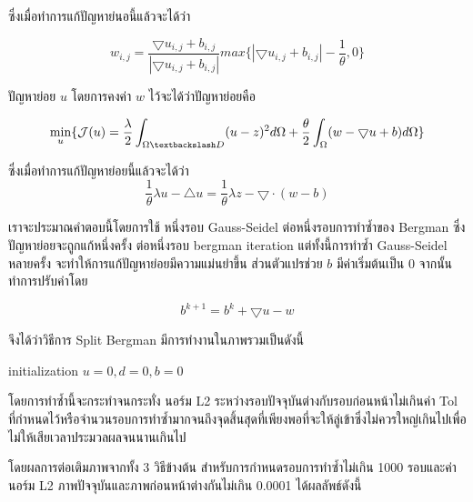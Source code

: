 \documentclass[hidelinks,a4paper,14pt]{article}
\numberwithin{equation}{section}							%
\begin{document}
{			ซึ่งเมื่อทำการแก้ปัญหาย่นอนี้แล้วจะได้ว่า
			
				$$ w_{i,j} = \frac{\bigtriangledown u_{i,j}  + b_{i,j} }{ | \bigtriangledown u_{i,j}  + b_{i,j} | } max \{  | \bigtriangledown u_{i,j}  + b_{i,j} | - \frac{1}{\theta} , 0\} $$
				
			ปัญหาย่อย $u$ โดยการคงค่า $w$ ไว้จะได้ว่าปัญหาย่อยคือ

				$$\min_{u} \{ \mathcal{J}(u) = \frac{\lambda}{2} \int_{\Omega \textbackslash D} (u-z)^2 d\Omega + \frac{\theta}{2} \int_{\Omega} (w - \bigtriangledown u + b) d\Omega \}$$
				
			ซึ่งเมื่อทำการแก้ปัญหาย่อยนี้แล้วจะได้ว่า
			$$ \frac{1}{\theta}\lambda u - \bigtriangleup u = \frac{1}{\theta} \lambda z - \bigtriangledown \cdot (w-b) $$
			
			เราจะประมาณคำตอบนี้โดยการใช้ หนึ่งรอบ Gauss-Seidel ต่อหนึ่งรอบการทำซ้ำของ Bergman ซึ่งปัญหาย่อยจะถูกแก้หนึ่งครั้ง ต่อหนึ่งรอบ bergman iteration แต่ทั้งนี้การทำซ้ำ Gauss-Seidel หลายครั้ง จะทำให้การแก้ปัญหาย่อยมีความแม่นยำขึ้น
			ส่วนตัวแปรช่วย $b$ มีค่าเริ่มต้นเป็น 0 จากนั้นทำการปรับค่าโดย
			
			$$ b^{k+1} = b^k  + \bigtriangledown u - w $$
						
			จึงได้ว่าวิธีการ Split Bergman มีการทำงานในภาพรวมเป็นดังนี้
			
			
			
			\begin{algorithm}[H]
				\begin{framed}
					initialization $u = 0, d = 0, b = 0$\\
				\end{framed}
			\end{algorithm}
			
			
			
			โดยการทำซ้ำนี้จะกระทำจนกระทั่ง นอร์ม L2 ระหว่างรอบปัจจุบันต่างกับรอบก่อนหน้าไม่เกินค่า Tol ที่กำหนดไว้หรือจำนวนรอบการทำซ้ำมากจนถึงจุดสิ้นสุดที่เพียงพอที่จะให้ลู่เข้าซึ่งไม่ควรใหญ่เกินไปเพื่อไม่ให้เสียเวลาประมวลผลจนนานเกินไป 

			โดยผลการต่อเติมภาพจากทั้ง 3 วิธีข้างต้น สำหรับการกำหนดรอบการทำซ้ำไม่เกิน 1000 รอบและค่านอร์ม L2 ภาพปัจจุบันและภาพก่อนหน้าต่างกันไม่เกิน 0.0001 ได้ผลลัพธ์ดังนี้
			
}
\end{document}
